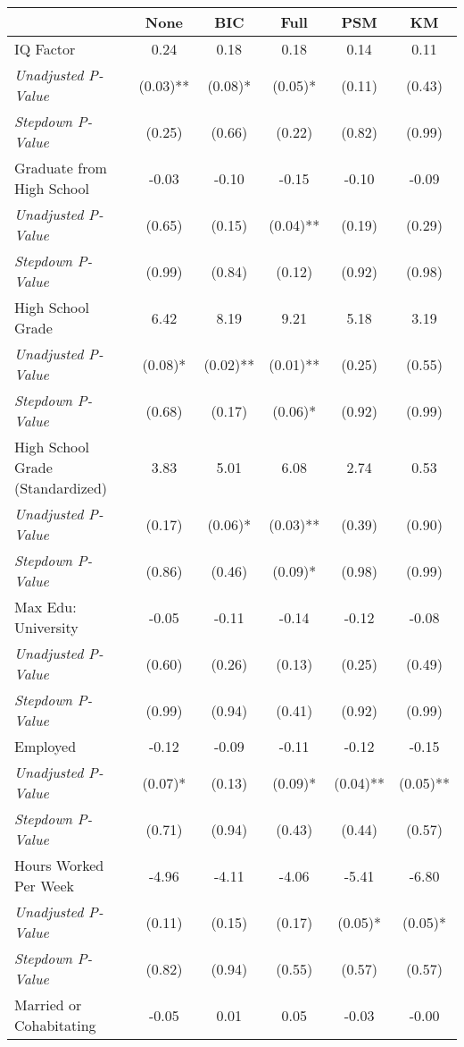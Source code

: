 \begin{tabular}{l c c c c c}
\toprule
 & None & BIC & Full & PSM & KM \\
\midrule
IQ Factor & 0.24 & 0.18 & 0.18 & 0.14 & 0.11 \\
\quad \textit{Unadjusted P-Value} & (0.03)** & (0.08)* & (0.05)* & (0.11) & (0.43) \\
\quad \textit{Stepdown P-Value} & (0.25) & (0.66) & (0.22) & (0.82) & (0.99) \\
Graduate from High School & -0.03 & -0.10 & -0.15 & -0.10 & -0.09 \\
\quad \textit{Unadjusted P-Value} & (0.65) & (0.15) & (0.04)** & (0.19) & (0.29) \\
\quad \textit{Stepdown P-Value} & (0.99) & (0.84) & (0.12) & (0.92) & (0.98) \\
High School Grade & 6.42 & 8.19 & 9.21 & 5.18 & 3.19 \\
\quad \textit{Unadjusted P-Value} & (0.08)* & (0.02)** & (0.01)** & (0.25) & (0.55) \\
\quad \textit{Stepdown P-Value} & (0.68) & (0.17) & (0.06)* & (0.92) & (0.99) \\
High School Grade (Standardized) & 3.83 & 5.01 & 6.08 & 2.74 & 0.53 \\
\quad \textit{Unadjusted P-Value} & (0.17) & (0.06)* & (0.03)** & (0.39) & (0.90) \\
\quad \textit{Stepdown P-Value} & (0.86) & (0.46) & (0.09)* & (0.98) & (0.99) \\
Max Edu: University & -0.05 & -0.11 & -0.14 & -0.12 & -0.08 \\
\quad \textit{Unadjusted P-Value} & (0.60) & (0.26) & (0.13) & (0.25) & (0.49) \\
\quad \textit{Stepdown P-Value} & (0.99) & (0.94) & (0.41) & (0.92) & (0.99) \\
Employed & -0.12 & -0.09 & -0.11 & -0.12 & -0.15 \\
\quad \textit{Unadjusted P-Value} & (0.07)* & (0.13) & (0.09)* & (0.04)** & (0.05)** \\
\quad \textit{Stepdown P-Value} & (0.71) & (0.94) & (0.43) & (0.44) & (0.57) \\
Hours Worked Per Week & -4.96 & -4.11 & -4.06 & -5.41 & -6.80 \\
\quad \textit{Unadjusted P-Value} & (0.11) & (0.15) & (0.17) & (0.05)* & (0.05)* \\
\quad \textit{Stepdown P-Value} & (0.82) & (0.94) & (0.55) & (0.57) & (0.57) \\
Married or Cohabitating & -0.05 & 0.01 & 0.05 & -0.03 & -0.00 \\

\end{tabular}
